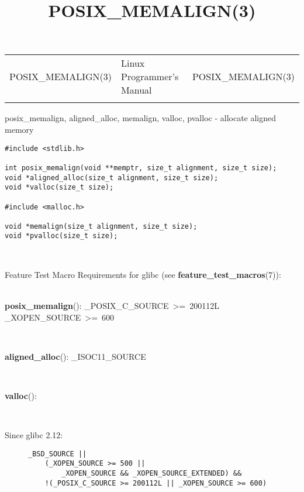 \documentclass[]{article}
\title{POSIX\_MEMALIGN(3)}
\author{}
\date{}
\let\realtextbf=\textbf
\renewcommand{\textbf}[1]{\textcolor{boldcolor}{\realtextbf{#1}}}
\begin{document}
\maketitle

\begin{longtable}[c]{@{}lll@{}}
\toprule\addlinespace
POSIX\_MEMALIGN(3) & Linux Programmer's Manual & POSIX\_MEMALIGN(3)
\\\addlinespace
\bottomrule
\end{longtable}


posix\_memalign, aligned\_alloc, memalign, valloc, pvalloc - allocate
aligned memory


\begin{verbatim}
#include <stdlib.h>
 
int posix_memalign(void **memptr, size_t alignment, size_t size);
void *aligned_alloc(size_t alignment, size_t size);
void *valloc(size_t size);
 
#include <malloc.h>
 
void *memalign(size_t alignment, size_t size);
void *pvalloc(size_t size);
\end{verbatim}

~

Feature Test Macro Requirements for glibc (see
\textbf{feature\_test\_macros}(7)): \\

~

\textbf{posix\_memalign}(): \_POSIX\_C\_SOURCE~\textgreater{}=~200112L
\textbar{}\textbar{} \_XOPEN\_SOURCE~\textgreater{}=~600

~

\textbf{aligned\_alloc}(): \_ISOC11\_SOURCE

~

\textbf{valloc}():

~

\begin{description}
\item[Since glibc 2.12:]
\begin{verbatim}
_BSD_SOURCE ||
    (_XOPEN_SOURCE >= 500 ||
        _XOPEN_SOURCE && _XOPEN_SOURCE_EXTENDED) &&
    !(_POSIX_C_SOURCE >= 200112L || _XOPEN_SOURCE >= 600)
 
    
\end{verbatim}
\end{description}
\end{document}
